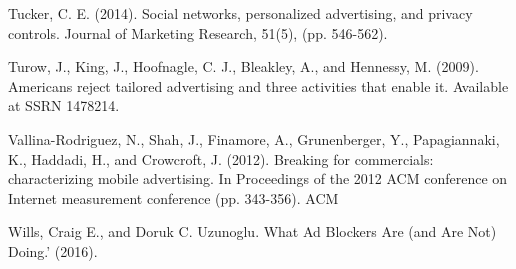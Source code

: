 \documentclass[conference]{IEEEtran}
\begin{document}
\begin{thebibliography}{99}
 Tucker, C. E. (2014). Social networks, personalized advertising, and privacy controls. Journal of Marketing Research, 51(5), (pp. 546-562).

 Turow, J., King, J., Hoofnagle, C. J., Bleakley, A., and Hennessy, M. (2009). Americans reject tailored advertising and three activities that enable it. Available at SSRN 1478214.

 Vallina-Rodriguez, N., Shah, J., Finamore, A., Grunenberger, Y., Papagiannaki, K., Haddadi, H., and Crowcroft, J. (2012). Breaking for commercials: characterizing mobile advertising. In Proceedings of the 2012 ACM conference on Internet measurement conference (pp. 343-356). ACM

 Wills, Craig E., and Doruk C. Uzunoglu. What Ad Blockers Are (and Are Not) Doing.' (2016).
\end{thebibliography}


\end{document}
